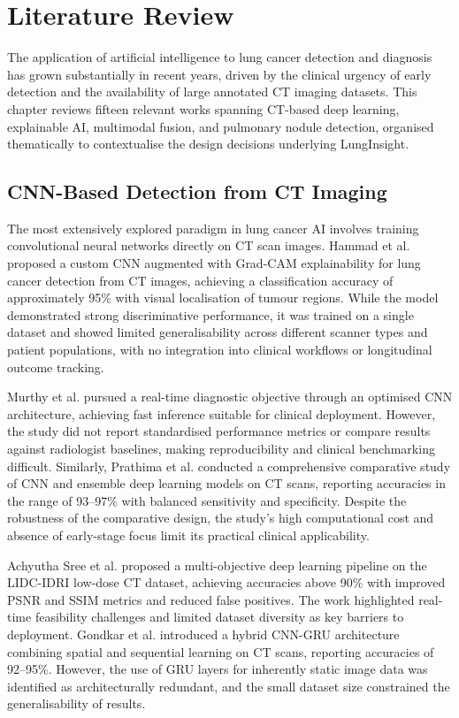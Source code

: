 \chapter{Literature Review}\thispagestyle{empty}
\graphicspath{{Chapter2/figures/}}
{

The application of artificial intelligence to lung cancer detection and diagnosis has grown
substantially in recent years, driven by the clinical urgency of early detection and the
availability of large annotated CT imaging datasets. This chapter reviews fifteen relevant
works spanning CT-based deep learning, explainable AI, multimodal fusion, and pulmonary
nodule detection, organised thematically to contextualise the design decisions underlying
LungInsight.

\section{CNN-Based Detection from CT Imaging}

The most extensively explored paradigm in lung cancer AI involves training convolutional
neural networks directly on CT scan images. Hammad et al. \cite{hammad2025} proposed a
custom CNN augmented with Grad-CAM explainability for lung cancer detection from CT
images, achieving a classification accuracy of approximately 95\% with visual
localisation of tumour regions. While the model demonstrated strong discriminative
performance, it was trained on a single dataset and showed limited generalisability
across different scanner types and patient populations, with no integration into clinical
workflows or longitudinal outcome tracking.

Murthy et al. \cite{murthy2025} pursued a real-time diagnostic objective through an
optimised CNN architecture, achieving fast inference suitable for clinical deployment.
However, the study did not report standardised performance metrics or compare results
against radiologist baselines, making reproducibility and clinical benchmarking
difficult. Similarly, Prathima et al. \cite{prathima2025} conducted a comprehensive
comparative study of CNN and ensemble deep learning models on CT scans, reporting
accuracies in the range of 93--97\% with balanced sensitivity and specificity. Despite
the robustness of the comparative design, the study's high computational cost and
absence of early-stage focus limit its practical clinical applicability.

Achyutha Sree et al. \cite{achyuthasree2025} proposed a multi-objective deep learning
pipeline on the LIDC-IDRI low-dose CT dataset, achieving accuracies above 90\% with
improved PSNR and SSIM metrics and reduced false positives. The work highlighted real-time
feasibility challenges and limited dataset diversity as key barriers to deployment.
Gondkar et al. \cite{gondkar2024} introduced a hybrid CNN-GRU architecture combining
spatial and sequential learning on CT scans, reporting accuracies of 92--95\%. However,
the use of GRU layers for inherently static image data was identified as architecturally
redundant, and the small dataset size constrained the generalisability of results.

}
